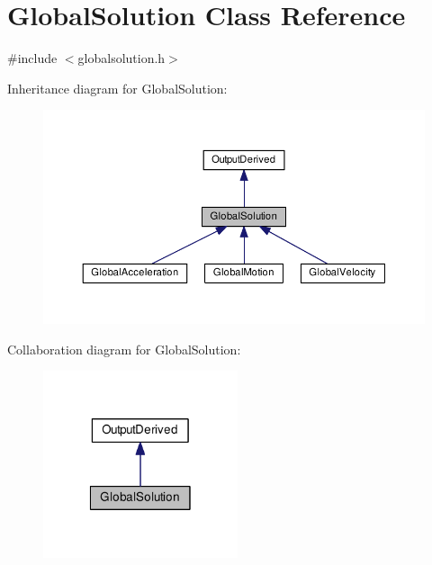 \hypertarget{class_global_solution}{\section{Global\-Solution Class Reference}
\label{class_global_solution}
}


{\ttfamily \#include $<$globalsolution.\-h$>$}



Inheritance diagram for Global\-Solution\-:\nopagebreak
\begin{figure}[H]
\begin{center}
\leavevmode
\includegraphics[width=350pt]{class_global_solution__inherit__graph}
\end{center}
\end{figure}


Collaboration diagram for Global\-Solution\-:\nopagebreak
\begin{figure}[H]
\begin{center}
\leavevmode
\includegraphics[width=162pt]{class_global_solution__coll__graph}
\end{center}
\end{figure}
